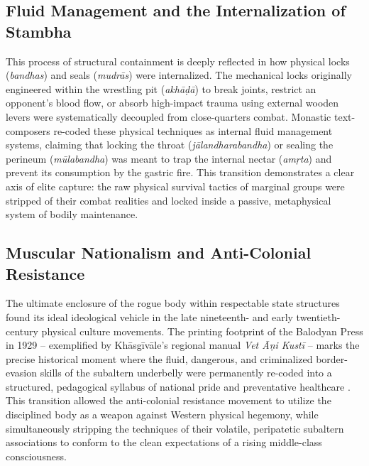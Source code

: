 \documentclass[11pt,twoside,letterpaper]{article}
\begin{document}
\subsection{Fluid Management and the Internalization of Stambha}
This process of structural containment is deeply reflected in how physical locks (\textit{bandhas}) and seals (\textit{mudr\={a}s}) were internalized. The mechanical locks originally engineered within the wrestling pit (\textit{akh\={a}\d{d}\={a}}) to break joints, restrict an opponent's blood flow, or absorb high-impact trauma using external wooden levers were systematically decoupled from close-quarters combat. Monastic text-composers re-coded these physical techniques as internal fluid management systems, claiming that locking the throat (\textit{j\={a}landharabandha}) or sealing the perineum (\textit{m\={u}labandha}) was meant to trap the internal nectar (\textit{am\d{r}ta}) and prevent its consumption by the gastric fire. This transition demonstrates a clear axis of elite capture: the raw physical survival tactics of marginal groups were stripped of their combat realities and locked inside a passive, metaphysical system of bodily maintenance.

\subsection{Muscular Nationalism and Anti-Colonial Resistance}
The ultimate enclosure of the rogue body within respectable state structures found its ideal ideological vehicle in the late nineteenth- and early twentieth-century physical culture movements. The printing footprint of the Balodyan Press in 1929 -- exemplified by Kh\={a}sg\={i}v\={a}le’s regional manual \textit{Vet \={A}\d{n}i Kust\={i}} -- marks the precise historical moment where the fluid, dangerous, and criminalized border-evasion skills of the subaltern underbelly were permanently re-coded into a structured, pedagogical syllabus of national pride and preventative healthcare \citep{Khasgivale1929}. This transition allowed the anti-colonial resistance movement to utilize the disciplined body as a weapon against Western physical hegemony, while simultaneously stripping the techniques of their volatile, peripatetic subaltern associations to conform to the clean expectations of a rising middle-class consciousness.
\end{document}
